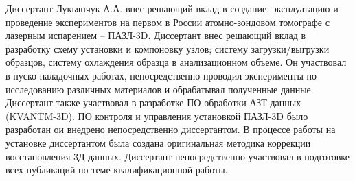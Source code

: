 {\contribution} Диссертант Лукьянчук А.А. внес решающий вклад в создание, эксплуатацию и проведение экспериментов на первом в России атомно-зондовом томографе с лазерным испарением – ПАЗЛ-3D. Диссертант внес решающий вклад в разработку схему установки и компоновку узлов; систему загрузки/выгрузки образцов, систему охлаждения образца в анализационном объеме. Он участвовал в  пуско-наладочных работах, непосредственно проводил эксперименты по исследованию различных материалов и обрабатывал полученные данные. Диссертант также участвовал в разработке ПО обработки АЗТ данных (KVANTM-3D). ПО контроля и управления установкой ПАЗЛ-3D было разработан ои внедрено непосредственно диссертантом. В процессе работы на установке диссертантом была создана оригинальная методика коррекции восстановления 3Д данных. Диссертант непосредственно участвовал в подготовке всех публикаций по теме квалификационной работы.










